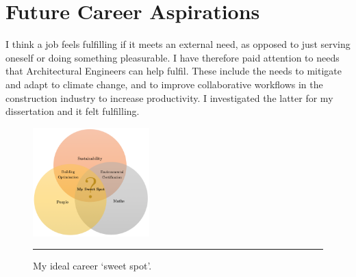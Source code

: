 
\section{Future Career Aspirations} \label{sec:future}


I think a job feels fulfilling if it meets an external need, as opposed to just serving oneself or doing something pleasurable.
I have therefore paid attention to needs that Architectural Engineers can help fulfil.
These include the needs to mitigate and adapt to climate change,
and to improve collaborative workflows in the construction industry to increase productivity.
I investigated the latter for my dissertation and it felt fulfilling.


\begin{figure}
	\centering
	\includegraphics[width=0.4\textwidth]{figures/sweetspot2.png}
	\rule{0.4\textwidth}{0.5pt} %
	\caption{My ideal career `sweet spot'.}
	\label{fig:sweetspot}
\end{figure}


